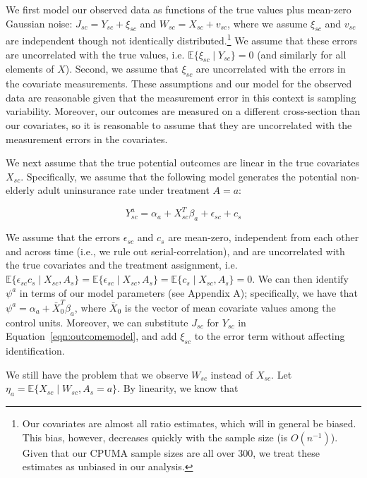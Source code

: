 \documentclass[article]{imsart}
\theoremstyle{plain}
\theoremstyle{remark}
\begin{document}
We first model our observed data as functions of the true values plus mean-zero Gaussian noise: $J_{sc} = Y_{sc} + \xi_{sc}$ and $W_{sc} = X_{sc} + v_{sc}$, where we assume $\xi_{sc}$ and $v_{sc}$ are independent though not identically distributed.\footnote{Our covariates are almost all ratio estimates, which will in general be biased. This bias, however, decreases quickly with the sample size (is $O(n^{-1})$). Given that our CPUMA sample sizes are all over 300, we treat these estimates as unbiased in our analysis.} We assume that these errors are uncorrelated with the true values, i.e. $\mathbb{E}\{\xi_{sc} \mid Y_{sc}\} = 0$ (and similarly for all elements of $X$). Second, we assume that $\xi_{sc}$ are uncorrelated with the errors in the covariate measurements. These assumptions and our model for the observed data are reasonable given that the measurement error in this context is sampling variability. Moreover, our outcomes are measured on a different cross-section than our covariates, so it is reasonable to assume that they are uncorrelated with the measurement errors in the covariates. 

We next assume that the true potential outcomes are linear in the true covariates $X_{sc}$. Specifically, we assume that the following model generates the potential non-elderly adult uninsurance rate under treatment $A = a$:

\begin{equation}\label{eqn:outcomemodel}
Y_{sc}^a = \alpha_a + X_{sc}^T\beta_a + \epsilon_{sc} + c_s
\end{equation}

We assume that the errors $\epsilon_{sc}$ and $c_s$ are mean-zero, independent from each other and across time (i.e., we rule out serial-correlation), and are uncorrelated with the true covariates and the treatment assignment, i.e. $\mathbb{E}\{\epsilon_{sc}c_s \mid X_{sc}, A_s\} = \mathbb{E}\{\epsilon_{sc} \mid X_{sc}, A_s\} = \mathbb{E}\{c_s \mid X_{sc}, A_s\} = 0$. We can then identify $\psi^a$ in terms of our model parameters (see Appendix A); specifically, we have that $\psi^a = \alpha_a + \bar{X}_0^T\beta_a$, where $\bar{X}_0$ is the vector of mean covariate values among the control units. Moreover, we can substitute $J_{sc}$ for $Y_{sc}$ in Equation~\ref{eqn:outcomemodel}, and add $\xi_{sc}$ to the error term without affecting identification. 

We still have the problem that we observe $W_{sc}$ instead of $X_{sc}$. Let $\eta_a = \mathbb{E}\{X_{sc} \mid W_{sc}, A_s = a\}$. By linearity, we know that
\end{document}
